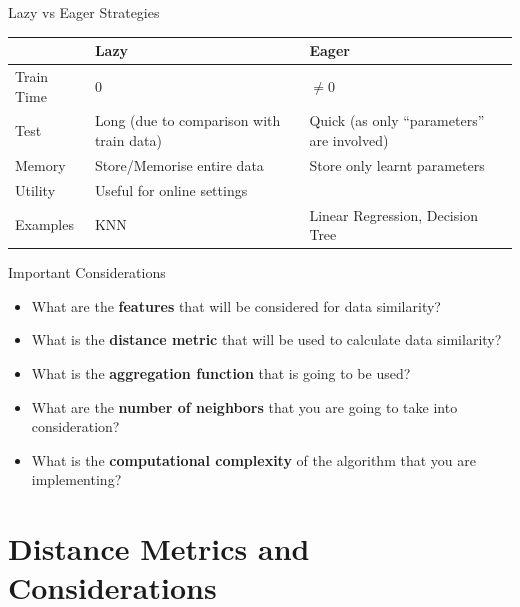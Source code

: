 \documentclass[usenames,dvipsnames]{beamer}
\begin{document}
\begin{frame}{Lazy vs Eager Strategies}
	\begin{table}[]
		\begin{tabular}{|l|p{3.5cm}|p{3.5cm}|}
			\hline
			& Lazy                                     & Eager                                   \\
			\hline
			Train Time & $0$                                      & $\neq 0$                                \\
			\hline
			Test       & Long (due to comparison with train data) & Quick (as only ``parameters'' are involved) \\
			\hline
			Memory     & Store/Memorise entire data               & Store only learnt parameters            \\
			\hline
			Utility    & Useful for online settings               &                                         \\
			\hline
			Examples   & KNN                                      & Linear Regression, Decision Tree       \\ \hline
		\end{tabular}
	\end{table}
\end{frame}

\begin{frame}{Important Considerations}
\begin{itemize}
\item<1-> What are the \textbf{features} that will be considered for data similarity?
\item<2-> What is the \textbf{distance metric} that will be used to calculate data similarity?
\item<3-> What is the \textbf{aggregation function} that is going to be used?
\item<4-> What are the \textbf{number of neighbors} that you are going to take into consideration?
\item<5-> What is the \textbf{computational complexity} of the algorithm that you are implementing?
\end{itemize}
\end{frame}

\section{Distance Metrics and Considerations}
\end{document}
